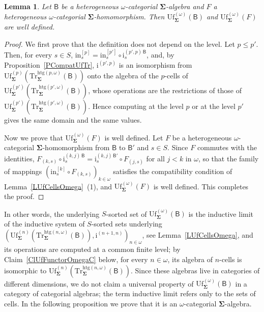 \documentclass[a4paper, reqno]{amsbook}
\newcommand{\sig}[1]{\mathbf{#1}}             %
\newcommand{\calg}[1]{\boldsymbol{\mathsf{#1}}} %
\newcommand{\htg}{\mathrm{htg}}                %
\newcommand{\Uf}{\mathrm{Uf}}
\newcommand{\Tr}{\mathrm{Tr}}
\theoremstyle{plain}
\newtheorem{lemma}[theorem]{Lemma}
\theoremstyle{definition}
\begin{document}
\begin{lemma}\label{LUfWellDefOmega}
Let $\calg{B}$ be a heterogeneous $\omega$-categorial $\sig{\Sigma}$-algebra and $F$ a heterogeneous $\omega$-categorial $\sig{\Sigma}$-homomorphism.
Then $\Uf^{(\omega)}_{\sig{\Sigma}}(\calg{B})$ and $\Uf^{(\omega)}_{\sig{\Sigma}}(F)$ are well defined.
\end{lemma}
\begin{proof}
We first prove that the definition does not depend on the level.
Let $p\leq p'$.
Then, for every $s\in S$, $\mathrm{in}^{[p]}_{s}=\mathrm{in}^{[p']}_{s}\circ\mathrm{i}^{(p',p)\,\calg{B}}_{s}$, and, by Proposition~\ref{PCompatUfTr}, $\mathrm{i}^{(p',p)}$ is an isomorphism from $\Uf^{(p)}_{\sig{\Sigma}}(\Tr^{\htg(p,\omega)}_{\sig{\Sigma}}(\calg{B}))$ onto the algebra of the $p$-cells of $\Uf^{(p')}_{\sig{\Sigma}}(\Tr^{\htg(p',\omega)}_{\sig{\Sigma}}(\calg{B}))$, whose operations are the restrictions of those of $\Uf^{(p')}_{\sig{\Sigma}}(\Tr^{\htg(p',\omega)}_{\sig{\Sigma}}(\calg{B}))$.
Hence computing at the level $p$ or at the level $p'$ gives the same domain and the same values.

Now we prove that $\Uf^{(\omega)}_{\sig{\Sigma}}(F)$ is well defined.
Let $F$ be a heterogeneous $\omega$-categorial $\sig{\Sigma}$-homomorphism from $\calg{B}$ to $\calg{B}'$ and $s\in S$.
Since $F$ commutes with the identities, $F_{(k,s)}\circ\mathrm{i}^{(k,j)\,\calg{B}}_{s}=\mathrm{i}^{(k,j)\,\calg{B}'}_{s}\circ F_{(j,s)}$ for all $j<k$ in $\omega$, so that the family of mappings $(\mathrm{in}^{[k]}_{s}\circ F_{(k,s)})_{k\in\omega}$ satisfies the compatibility condition of Lemma~\ref{LUfCellsOmega}~(1), and $\Uf^{(\omega)}_{\sig{\Sigma}}(F)$ is well defined. This completes the proof.
\end{proof}

In other words, the underlying $S$-sorted set of $\Uf^{(\omega)}_{\sig{\Sigma}}(\calg{B})$ is the inductive limit of the inductive system of $S$-sorted sets underlying $(\Uf^{(n)}_{\sig{\Sigma}}(\Tr^{\htg(n,\omega)}_{\sig{\Sigma}}(\calg{B})),\mathrm{i}^{(n+1,n)})_{n\in\omega}$, see Lemma~\ref{LUfCellsOmega}, and its operations are computed at a common finite level; by Claim~\ref{ClUfFunctorOmegaC} below, for every $n\in\omega$, its algebra of $n$-cells is isomorphic to $\Uf^{(n)}_{\sig{\Sigma}}(\Tr^{\htg(n,\omega)}_{\sig{\Sigma}}(\calg{B}))$.
Since these algebras live in categories of different dimensions, we do not claim a universal property of $\Uf^{(\omega)}_{\sig{\Sigma}}(\calg{B})$ in a category of categorial algebras; the term inductive limit refers only to the sets of cells.
In the following proposition we prove that it is an $\omega$-categorial $\sig{\Sigma}$-algebra.
\end{document}
